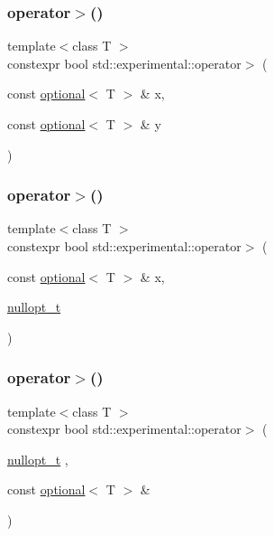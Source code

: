 \subsubsection{\texorpdfstring{operator$>$()}{operator>()}\hspace{0.1cm}{\footnotesize\ttfamily [1/9]}}
{\footnotesize\ttfamily template$<$class T $>$ \\
constexpr bool std\+::experimental\+::operator$>$ (\begin{DoxyParamCaption}\item[{const \hyperlink{classstd_1_1experimental_1_1optional}{optional}$<$ T $>$ \&}]{x,  }\item[{const \hyperlink{classstd_1_1experimental_1_1optional}{optional}$<$ T $>$ \&}]{y }\end{DoxyParamCaption})}

\mbox{\label{namespacestd_1_1experimental_ab0139892916a389ed15c89675d5512ac}} 
\subsubsection{\texorpdfstring{operator$>$()}{operator>()}\hspace{0.1cm}{\footnotesize\ttfamily [2/9]}}
{\footnotesize\ttfamily template$<$class T $>$ \\
constexpr bool std\+::experimental\+::operator$>$ (\begin{DoxyParamCaption}\item[{const \hyperlink{classstd_1_1experimental_1_1optional}{optional}$<$ T $>$ \&}]{x,  }\item[{\hyperlink{structstd_1_1experimental_1_1nullopt__t}{nullopt\+\_\+t}}]{ }\end{DoxyParamCaption})\hspace{0.3cm}{\ttfamily [noexcept]}}

\mbox{\label{namespacestd_1_1experimental_a02002e302d09fd9596aadd26a38043c0}} 
\subsubsection{\texorpdfstring{operator$>$()}{operator>()}\hspace{0.1cm}{\footnotesize\ttfamily [3/9]}}
{\footnotesize\ttfamily template$<$class T $>$ \\
constexpr bool std\+::experimental\+::operator$>$ (\begin{DoxyParamCaption}\item[{\hyperlink{structstd_1_1experimental_1_1nullopt__t}{nullopt\+\_\+t}}]{,  }\item[{const \hyperlink{classstd_1_1experimental_1_1optional}{optional}$<$ T $>$ \&}]{ }\end{DoxyParamCaption})\hspace{0.3cm}{\ttfamily [noexcept]}}

